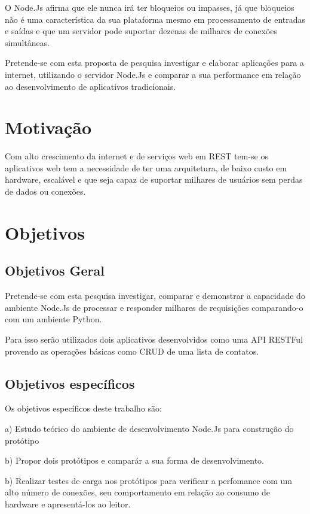   O Node.Js afirma que ele nunca irá ter bloqueios ou impasses, já que bloqueios não é uma característica 
  da sua plataforma mesmo em processamento de entradas e saídas e que um servidor pode suportar 
  dezenas de milhares de conexões simultâneas.\cite{Abernethy:2011}
  
  Pretende-se com esta proposta de pesquisa investigar e elaborar aplicações para a internet, 
  utilizando o servidor Node.Js e comparar a sua performance em relação ao desenvolvimento
  de aplicativos tradicionais.
  
  
\section{Motivação}
\label{motivacao}
  
  Com alto crescimento da internet e de serviços web em REST tem-se os aplicativos web tem a necessidade de ter
  uma arquitetura, de baixo custo em hardware, escalável e que seja capaz de suportar milhares de usuários 
  sem perdas de dados ou conexões. 
  
\section{Objetivos}
\label{objetivos}

\subsection{Objetivos Geral}

  Pretende-se com esta pesquisa investigar, comparar e demonstrar a capacidade 
  do ambiente Node.Js de processar e responder milhares de requisições comparando-o com um ambiente Python.
  
  Para isso serão utilizados dois aplicativos desenvolvidos como uma API RESTFul provendo as operações
  básicas como \ac{CRUD} de uma lista de contatos.
  
\subsection{Objetivos específicos}

  Os objetivos específicos deste trabalho são:
  
    \begin{compactitem}
      \item[a)] Estudo teórico do ambiente de desenvolvimento Node.Js para construção do protótipo 
      \item[b)] Propor dois protótipos e comparár a sua forma de desenvolvimento.
      \item[b)] Realizar testes de carga nos protótipos para verificar a perfomance com um alto número de conexões,
      seu comportamento em relação ao consumo de hardware e apresentá-los ao leitor.
    \end{compactitem}
  
